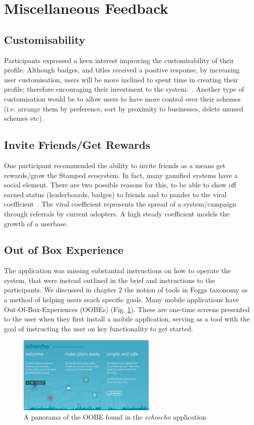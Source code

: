 \section{Miscellaneous Feedback}
\subsection{Customisability}
Participants expressed a keen interest improving the customisability of their profile. Although badges, and titles received a positive response, by increasing user customisation, users will be more inclined to spent time in creating their profile; therefore encouraging their investment to the system.~\cite{winWithGamification}. Another type of customisation would be to allow users to have more control over their schemes (i.e. arrange them by preference, sort by proximity to businesses, delete unused schemes etc).
\subsection{Invite Friends/Get Rewards}
\label{sec:invite}
One participant recommended the ability to invite friends as a means get rewards/grow the Stamped ecosystem. In fact, many gamified systems have a social element. There are two possible reasons for this, to be able to show off earned status (leaderboards, badges) to friends and to pander to the viral coefficient~\cite{viral}. The viral coefficient represents the spread of a system/campaign through referrals by current adopters. A high steady coefficient models the growth of a userbase.%
\subsection{Out of Box Experience}
The application was missing substantial instructions on how to operate the system, that were instead outlined in the brief and instructions to the participants. We discussed in chapter 2 the notion of tools in Foggs taxonomy as a method of helping users reach specific goals. Many mobile applications have Out-Of-Box-Experiences (OOBEs) (Fig. \ref{fig:OOBE}). These are one-time screens presented to the user when they first install a mobile application,  serving as a tool with the goal of instructing the user on key functionality to get started. 
\begin{figure}[H]
 \centering
  \includegraphics[width=0.6\textwidth]{img/OOBE.png}
     \caption{A panorama of the OOBE found in the \emph{echoecho} application}
     \label{fig:OOBE}
\end{figure}
